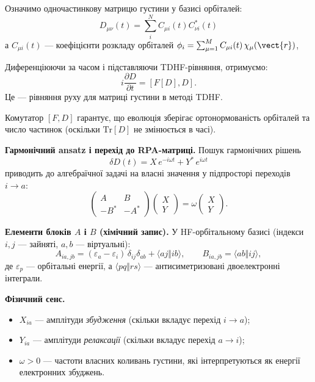 Означимо одночастинкову матрицю густини у базисі орбіталей:
\[
    D_{\mu\nu}(t) = \sum_{i}^{N} C_{\mu i}(t) C_{\nu i}^*(t)
\]
а \(C_{\mu i}(t)\) --- коефіцієнти розкладу орбіталей
$\phi_i = \sum_{\mu=1}^{M} C_{\mu i} (t)\,\chi_\mu(\vect{r})$,


Диференціюючи за часом і підставляючи TDHF-рівняння, отримуємо:
\[
    \boxed{i\frac{\partial D}{\partial t} = [F[D], D]}.
\]
Це --- рівняння руху для матриці густини в методі TDHF.

Комутатор \([F,D]\) гарантує, що еволюція зберігає ортонормованість орбіталей
та число частинок (оскільки \(\mathrm{Tr}[D]\) не змінюється в часі).


\noindent\textbf{Гармонічний ansatz і перехід до RPA-матриці.}
Пошук гармонічних рішень
\[
    \delta D(t)=X\,e^{-i\omega t}+Y^*\,e^{i\omega t}
\]
приводить до алгебраїчної задачі на власні значення у підпросторі переходів $i\to a$:
\[
    \begin{pmatrix}
        A    & B    \\
        -B^* & -A^*
    \end{pmatrix}
    \begin{pmatrix}
        X \\ Y
    \end{pmatrix}
    =\omega
    \begin{pmatrix}
        X \\ Y
    \end{pmatrix}.
\]

\noindent\textbf{Елементи блоків $A$ і $B$ (хімічний запис).}
У HF-орбітальному базисі (індекси $i,j$ --- зайняті, $a,b$ --- віртуальні):
\[
    A_{ia,jb}=(\varepsilon_a-\varepsilon_i)\,\delta_{ij}\delta_{ab}
    +\langle aj\Vert ib\rangle,
    \qquad
    B_{ia,jb}=\langle ab\Vert ij\rangle,
\]
де $\varepsilon_p$ --- орбітальні енергії, а $\langle pq\Vert rs\rangle$
— антисиметризовані двоелектронні інтеграли.

\noindent\textbf{Фізичний сенс.}
\begin{itemize}
    \item $X_{ia}$ --- амплітуди \emph{збудження} (скільки вкладує перехід $i\to a$);
    \item $Y_{ia}$ --- амплітуди \emph{релаксації} (скільки вкладує перехід $a\to i$);
    \item $\omega>0$ --- частоти власних коливань густини, які інтерпретуються як енергії електронних збуджень.
\end{itemize}



